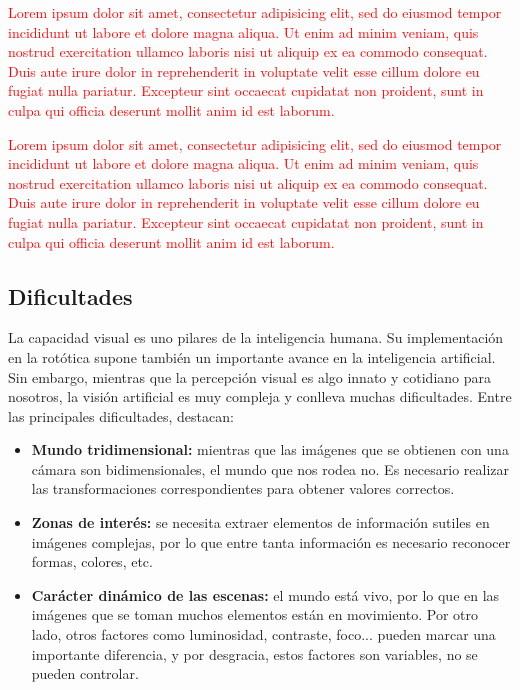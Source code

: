 \textcolor{red}{Lorem ipsum dolor sit amet, consectetur adipisicing elit, sed do
 eiusmod tempor incididunt ut labore et dolore magna aliqua. Ut enim ad minim 
 veniam, quis nostrud exercitation ullamco laboris nisi ut aliquip ex ea commodo 
 consequat. Duis aute irure dolor in reprehenderit in voluptate velit esse cillum
 dolore eu fugiat nulla pariatur. Excepteur sint occaecat cupidatat non proident,
 sunt in culpa qui officia deserunt mollit anim id est laborum.}

\textcolor{red}{Lorem ipsum dolor sit amet, consectetur adipisicing elit, sed do
 eiusmod tempor incididunt ut labore et dolore magna aliqua. Ut enim ad minim 
 veniam, quis nostrud exercitation ullamco laboris nisi ut aliquip ex ea commodo 
 consequat. Duis aute irure dolor in reprehenderit in voluptate velit esse cillum
 dolore eu fugiat nulla pariatur. Excepteur sint occaecat cupidatat non proident,
 sunt in culpa qui officia deserunt mollit anim id est laborum.}

\subsection{Dificultades}
La capacidad visual es uno pilares de la inteligencia humana. Su implementación
en la rotótica supone también un importante avance en la inteligencia artificial.
Sin embargo, mientras que la percepción visual es algo innato y cotidiano para
nosotros, la visión artificial es muy compleja y conlleva muchas dificultades.
Entre las principales dificultades, destacan:

\begin{itemize}
  \item \textbf{Mundo tridimensional:} mientras que las imágenes que se obtienen
  con una cámara son bidimensionales, el mundo que nos rodea no. Es necesario 
  realizar las transformaciones correspondientes para obtener valores correctos.
  \item \textbf{Zonas de interés:} se necesita extraer elementos de información 
  sutiles en imágenes complejas, por lo que entre tanta información es necesario
  reconocer formas, colores, etc.
  \item \textbf{Carácter dinámico de las escenas:} el mundo está vivo, por lo
  que en las imágenes que se toman muchos elementos están en movimiento. Por 
  otro lado, otros factores como luminosidad, contraste, foco... pueden marcar
  una importante diferencia, y por desgracia, estos factores son variables, no
  se pueden controlar.
\end{itemize}

